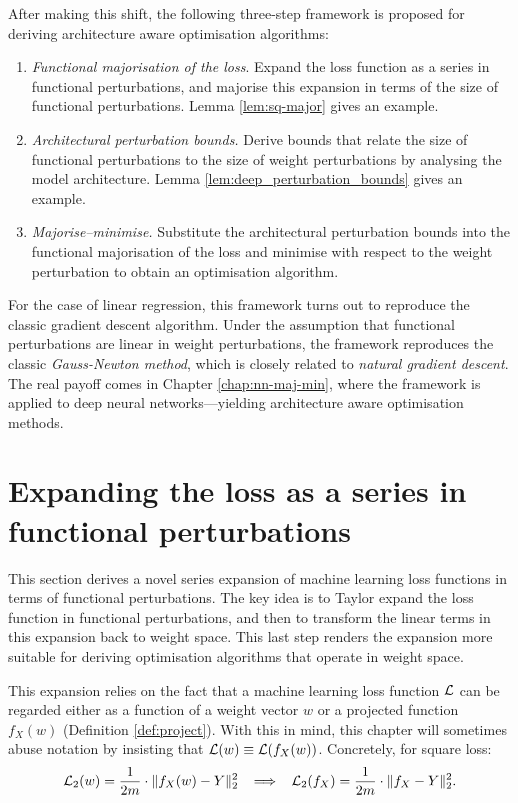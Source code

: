 \begin{refsection}
After making this shift, the following three-step framework is proposed for deriving architecture aware optimisation algorithms:
\begin{enumerate}[label=Step \arabic*:, leftmargin=*, font=\sffamily]
    \item \textit{Functional majorisation of the loss}. Expand the loss function as a series in functional perturbations, and majorise this expansion in terms of the size of functional perturbations. Lemma \ref{lem:sq-major} gives an example.
    \item \textit{Architectural perturbation bounds.} Derive bounds that relate the size of functional perturbations to the size of weight perturbations by analysing the model architecture. Lemma \ref{lem:deep_perturbation_bounds} gives an example.
    \item \textit{Majorise--minimise.} Substitute the architectural perturbation bounds into the functional majorisation of the loss and minimise with respect to the weight perturbation to obtain an optimisation algorithm.
\end{enumerate}

For the case of linear regression, this framework turns out to reproduce the classic gradient descent algorithm. Under the assumption that functional perturbations are linear in weight perturbations, the framework reproduces the classic \textit{Gauss-Newton method}, which is closely related to \textit{natural gradient descent}. The real payoff comes in Chapter \ref{chap:nn-maj-min}, where the framework is applied to deep neural networks---yielding architecture aware optimisation methods.

\section{Expanding the loss as a series in functional perturbations}

This section derives a novel series expansion of machine learning loss functions in terms of functional perturbations. The key idea is to Taylor expand the loss function in functional perturbations, and then to transform the linear terms in this expansion back to weight space. This last step renders the expansion more suitable for deriving optimisation algorithms that operate in weight space.

This expansion relies on the fact that a machine learning loss function $\mathcal{L}$ can be regarded either as a function of a weight vector $w$ or a projected function $f_X(w)$ (Definition \ref{def:project}). With this in mind, this chapter will sometimes abuse notation by insisting that $\mathcal{L}(w) \equiv \mathcal{L}(f_X(w))$. Concretely, for square loss:
\begin{equation*}
    \mathcal{L}_2(w) = \frac{1}{2m}\cdot\Vert {f_X(w)-Y} \Vert_2^2\;\;\implies\;\;
    \mathcal{L}_2(f_X) = \frac{1}{2m}\cdot\Vert {f_X-Y} \Vert_2^2.
\end{equation*}


\end{refsection}
